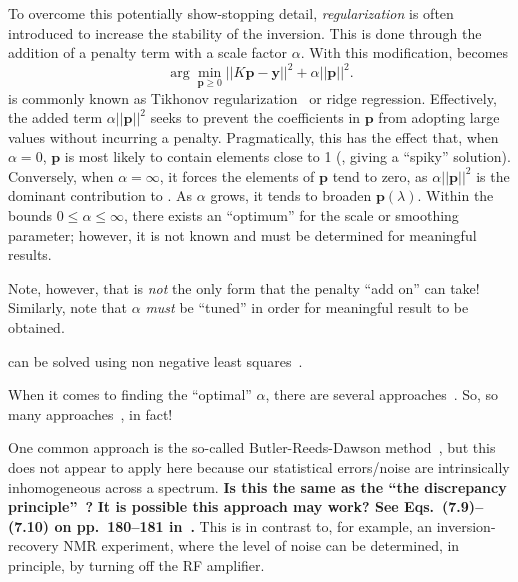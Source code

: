 To overcome this potentially show-stopping detail, \emph{regularization} is often introduced to increase the stability of the inversion.
This is done through the addition of a penalty term with a scale factor $\alpha$.
With this modification,  becomes
\begin{equation}
\label{eq:rnnls}
   \arg \min_{\mathbf{p} \geq 0} || K \mathbf{p} - \mathbf{y} ||^{2} + \alpha || \mathbf{p} ||^{2} .
\end{equation}
 is commonly known as Tikhonov regularization~\cite{1995-Tikhonov-NMSIPP} or ridge regression.
Effectively, the added term $\alpha || \mathbf{p} ||^{2}$ seeks to prevent the coefficients in $\mathbf{p}$ from adopting large values without incurring a penalty.
Pragmatically, this has the effect that, when $\alpha = 0$, $\mathbf{p}$ is most likely to contain elements close to 1 (, giving a ``spiky'' solution).
Conversely, when $\alpha = \infty$, it forces the elements of $\mathbf{p}$ tend to zero, as $\alpha || \mathbf{p} ||^{2}$ is the dominant contribution to .
As $\alpha$ grows, it tends to broaden $\mathbf{p}(\lambda)$.
Within the bounds $0 \leq \alpha \leq \infty$, there exists an ``optimum'' for the scale or smoothing parameter;
however, it is not known  and must be determined for meaningful results.




Note, however, that  is \emph{not} the only form that the penalty ``add on'' can take!
Similarly, note that $\alpha$ \emph{must} be ``tuned'' in order for meaningful result to be obtained.


 can be solved using non negative least squares~\cite{1995-Lawson-SLSP}.



When it comes to finding the ``optimal'' $\alpha$, there are several approaches~\cite{2001-Kilmer-SIAMJMAA-22-1204}.
So, so many approaches~\cite{2011-Bauer-MCS-81-1795}, in fact!


One common approach is the so-called Butler-Reeds-Dawson method~\cite{1981-Butler-SIAMJNMA-18-381}, but this does not appear to apply here because our statistical errors/noise are intrinsically inhomogeneous across a spectrum.
\textbf{Is this the same as the ``the discrepancy principle''~\cite{1966-Morozon-DANSSR-167-510}?}
\textbf{It is possible this approach may work? See Eqs.~(7.9)--(7.10) on pp.~180--181 in~\cite{1998-Hansen-RDDIPP}.}
This is in contrast to, for example, an inversion-recovery NMR experiment, where the level of noise can be determined, in principle, by turning off the RF amplifier.



